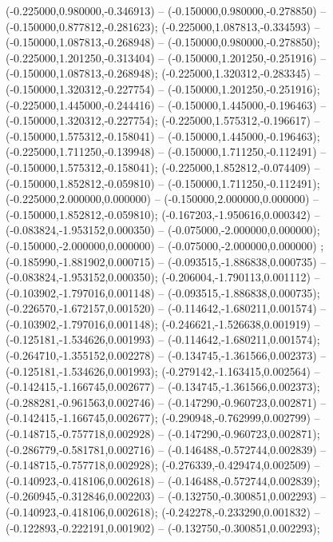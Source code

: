  (-0.225000,0.980000,-0.346913) -- (-0.150000,0.980000,-0.278850) -- (-0.150000,0.877812,-0.281623);
 (-0.225000,1.087813,-0.334593) -- (-0.150000,1.087813,-0.268948) -- (-0.150000,0.980000,-0.278850);
 (-0.225000,1.201250,-0.313404) -- (-0.150000,1.201250,-0.251916) -- (-0.150000,1.087813,-0.268948);
 (-0.225000,1.320312,-0.283345) -- (-0.150000,1.320312,-0.227754) -- (-0.150000,1.201250,-0.251916);
 (-0.225000,1.445000,-0.244416) -- (-0.150000,1.445000,-0.196463) -- (-0.150000,1.320312,-0.227754);
 (-0.225000,1.575312,-0.196617) -- (-0.150000,1.575312,-0.158041) -- (-0.150000,1.445000,-0.196463);
 (-0.225000,1.711250,-0.139948) -- (-0.150000,1.711250,-0.112491) -- (-0.150000,1.575312,-0.158041);
 (-0.225000,1.852812,-0.074409) -- (-0.150000,1.852812,-0.059810) -- (-0.150000,1.711250,-0.112491);
 (-0.225000,2.000000,0.000000) -- (-0.150000,2.000000,0.000000) -- (-0.150000,1.852812,-0.059810);
 (-0.167203,-1.950616,0.000342) -- (-0.083824,-1.953152,0.000350) -- (-0.075000,-2.000000,0.000000);
 (-0.150000,-2.000000,0.000000) -- (-0.075000,-2.000000,0.000000) ;
 (-0.185990,-1.881902,0.000715) -- (-0.093515,-1.886838,0.000735) -- (-0.083824,-1.953152,0.000350);
 (-0.206004,-1.790113,0.001112) -- (-0.103902,-1.797016,0.001148) -- (-0.093515,-1.886838,0.000735);
 (-0.226570,-1.672157,0.001520) -- (-0.114642,-1.680211,0.001574) -- (-0.103902,-1.797016,0.001148);
 (-0.246621,-1.526638,0.001919) -- (-0.125181,-1.534626,0.001993) -- (-0.114642,-1.680211,0.001574);
 (-0.264710,-1.355152,0.002278) -- (-0.134745,-1.361566,0.002373) -- (-0.125181,-1.534626,0.001993);
 (-0.279142,-1.163415,0.002564) -- (-0.142415,-1.166745,0.002677) -- (-0.134745,-1.361566,0.002373);
 (-0.288281,-0.961563,0.002746) -- (-0.147290,-0.960723,0.002871) -- (-0.142415,-1.166745,0.002677);
 (-0.290948,-0.762999,0.002799) -- (-0.148715,-0.757718,0.002928) -- (-0.147290,-0.960723,0.002871);
 (-0.286779,-0.581781,0.002716) -- (-0.146488,-0.572744,0.002839) -- (-0.148715,-0.757718,0.002928);
 (-0.276339,-0.429474,0.002509) -- (-0.140923,-0.418106,0.002618) -- (-0.146488,-0.572744,0.002839);
 (-0.260945,-0.312846,0.002203) -- (-0.132750,-0.300851,0.002293) -- (-0.140923,-0.418106,0.002618);
 (-0.242278,-0.233290,0.001832) -- (-0.122893,-0.222191,0.001902) -- (-0.132750,-0.300851,0.002293);
